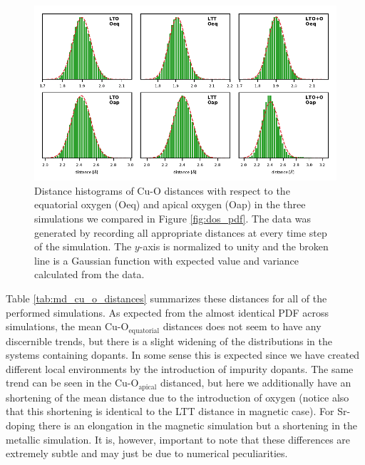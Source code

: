 \begin{figure}
	\centering
	\includegraphics[width=\textwidth]{fig/md/dist_hist.pdf}
	\caption[MD: distance histograms]{Distance histograms of Cu-O distances with respect to the equatorial oxygen (Oeq) and apical oxygen (Oap) in the three simulations we compared in Figure \ref{fig:dos_pdf}. The data was generated by recording all appropriate distances at every time step of the simulation. The $y$-axis is normalized to unity and the broken line is a Gaussian function with expected value and variance calculated from the data.}
	\label{fig:md_distances}
\end{figure}

Table \ref{tab:md_cu_o_distances} summarizes these distances for all of the performed simulations. As expected from the almost identical PDF across simulations, the mean Cu-O$_\text{equatorial}$ distances does not seem to have any discernible trends, but there is a slight widening of the distributions in the systems containing dopants. In some sense this is expected since we have created different local environments by the introduction of impurity dopants. The same trend can be seen in the Cu-O$_\text{apical}$ distanced, but here we additionally have an shortening of the mean distance due to the introduction of oxygen (notice also that this shortening is identical to the LTT distance in magnetic case). For Sr-doping there is an elongation in the magnetic simulation but a shortening in the metallic simulation. It is, however, important to note that these differences are extremely subtle and may just be due to numerical peculiarities.

